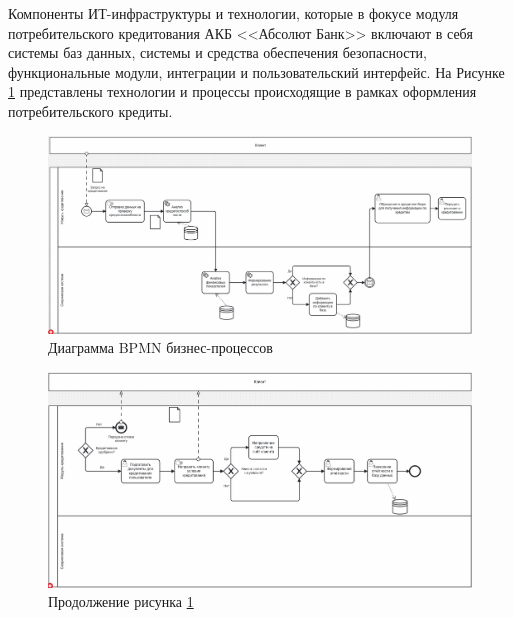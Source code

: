 \documentclass[14pt, a4paper]{extarticle}
\begin{document}
Компоненты ИТ-инфраструктуры и технологии, которые в фокусе модуля
потребительского кредитования АКБ <<Абсолют Банк>> включают в себя системы баз
данных, системы и средства обеспечения безопасности, функциональные модули,
интеграции и пользовательский интерфейс. На Рисунке \ref{fig:bpmn0}
представлены технологии и процессы происходящие в рамках
оформления потребительского кредиты.

\begin{figure}[H]
	\centering
	\includegraphics[scale=0.3]{bpmn_diagram_0.png}
	\caption{Диаграмма BPMN бизнес-процессов}
	\label{fig:bpmn0}
\end{figure}

\begin{figure}[H]
	\centering
	\includegraphics[scale=0.33]{bpmn_diagram_1.png}
	\caption*{Продолжение рисунка \ref{fig:bpmn0}}
	\label{fig:bpmn1}
\end{figure}
\end{document}
